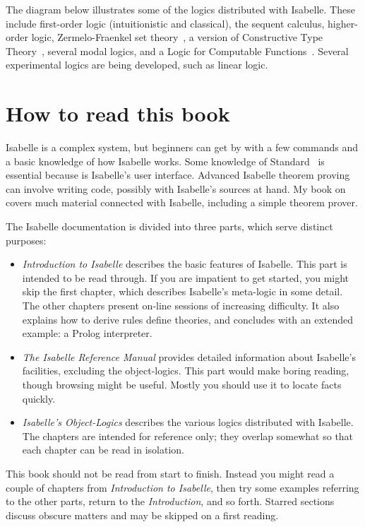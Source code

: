 The diagram below illustrates some of the logics distributed with Isabelle.
These include first-order logic (intuitionistic and classical), the sequent
calculus, higher-order logic, Zermelo-Fraenkel set theory~\cite{suppes72},
a version of Constructive Type Theory~\cite{nordstrom90}, several modal
logics, and a Logic for Computable Functions~\cite{paulson87}.  Several
experimental logics are being developed, such as linear logic.

\centerline{}


\section*{How to read this book}
Isabelle is a complex system, but beginners can get by with a few commands
and a basic knowledge of how Isabelle works.  Some knowledge of
Standard~\ML{} is essential because \ML{} is Isabelle's user interface.
Advanced Isabelle theorem proving can involve writing \ML{} code, possibly
with Isabelle's sources at hand.  My book on~\ML{}~\cite{paulson91} covers
much material connected with Isabelle, including a simple theorem prover.

The Isabelle documentation is divided into three parts, which serve
distinct purposes:
\begin{itemize}
\item {\em Introduction to Isabelle\/} describes the basic features of
  Isabelle.  This part is intended to be read through.  If you are
  impatient to get started, you might skip the first chapter, which
  describes Isabelle's meta-logic in some detail.  The other chapters
  present on-line sessions of increasing difficulty.  It also explains how
  to derive rules define theories, and concludes with an extended example:
  a Prolog interpreter.

\item {\em The Isabelle Reference Manual\/} provides detailed information
  about Isabelle's facilities, excluding the object-logics.  This part
  would make boring reading, though browsing might be useful.  Mostly you
  should use it to locate facts quickly.

\item {\em Isabelle's Object-Logics\/} describes the various logics
  distributed with Isabelle.  The chapters are intended for reference only;
  they overlap somewhat so that each chapter can be read in isolation.
\end{itemize}
This book should not be read from start to finish.  Instead you might read
a couple of chapters from {\em Introduction to Isabelle}, then try some
examples referring to the other parts, return to the {\em Introduction},
and so forth.  Starred sections discuss obscure matters and may be skipped
on a first reading.




